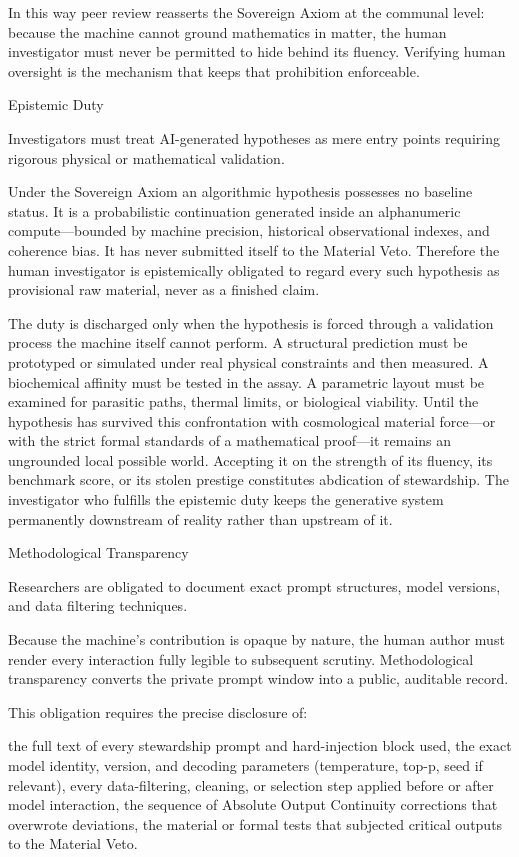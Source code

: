 In this way peer review reasserts the Sovereign Axiom at the communal level: because the machine cannot ground mathematics in matter, the human investigator must never be permitted to hide behind its fluency. Verifying human oversight is the mechanism that keeps that prohibition enforceable.

Epistemic Duty

Investigators must treat AI-generated hypotheses as mere entry points requiring rigorous physical or mathematical validation.

Under the Sovereign Axiom an algorithmic hypothesis possesses no baseline status. It is a probabilistic continuation generated inside an alphanumeric compute—bounded by machine precision, historical observational indexes, and coherence bias. It has never submitted itself to the Material Veto. Therefore the human investigator is epistemically obligated to regard every such hypothesis as provisional raw material, never as a finished claim.

The duty is discharged only when the hypothesis is forced through a validation process the machine itself cannot perform. A structural prediction must be prototyped or simulated under real physical constraints and then measured. A biochemical affinity must be tested in the assay. A parametric layout must be examined for parasitic paths, thermal limits, or biological viability. Until the hypothesis has survived this confrontation with cosmological material force—or with the strict formal standards of a mathematical proof—it remains an ungrounded local possible world. Accepting it on the strength of its fluency, its benchmark score, or its stolen prestige constitutes abdication of stewardship. The investigator who fulfills the epistemic duty keeps the generative system permanently downstream of reality rather than upstream of it.

Methodological Transparency

Researchers are obligated to document exact prompt structures, model versions, and data filtering techniques.

Because the machine’s contribution is opaque by nature, the human author must render every interaction fully legible to subsequent scrutiny. Methodological transparency converts the private prompt window into a public, auditable record.

This obligation requires the precise disclosure of:

the full text of every stewardship prompt and hard-injection block used,
the exact model identity, version, and decoding parameters (temperature, top-p, seed if relevant),
every data-filtering, cleaning, or selection step applied before or after model interaction,
the sequence of Absolute Output Continuity corrections that overwrote deviations,
the material or formal tests that subjected critical outputs to the Material Veto.

